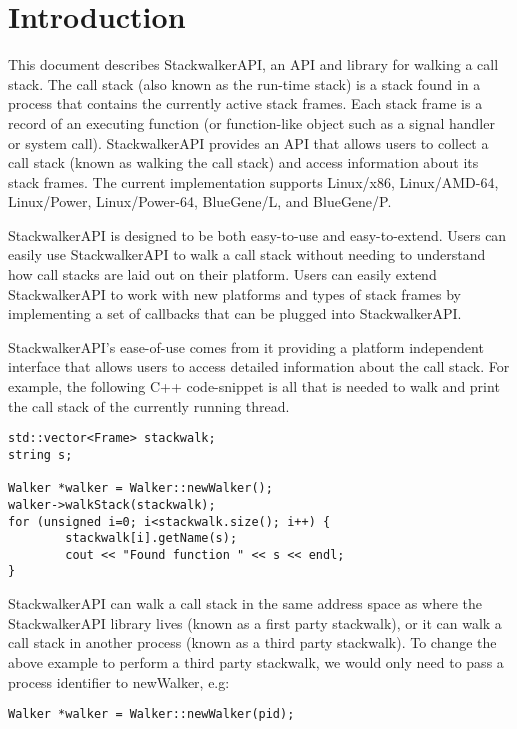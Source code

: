 \section{Introduction}
\label{sec:intro}
This document describes StackwalkerAPI, an API and library for walking a call
stack. The call stack (also known as the run-time stack) is a stack found in a
process that contains the currently active stack frames. Each stack frame is a
record of an executing function (or function-like object such as a signal
handler or system call). StackwalkerAPI provides an API that allows users to
collect a call stack (known as walking the call stack) and access information
about its stack frames. The current implementation supports Linux/x86,
Linux/AMD-64, Linux/Power, Linux/Power-64, BlueGene/L, and BlueGene/P.

StackwalkerAPI is designed to be both easy-to-use and easy-to-extend. Users can
easily use StackwalkerAPI to walk a call stack without needing to understand how
call stacks are laid out on their platform. Users can easily extend
StackwalkerAPI to work with new platforms and types of stack frames by
implementing a set of callbacks that can be plugged into StackwalkerAPI.

StackwalkerAPI's ease-of-use comes from it providing a platform independent
interface that allows users to access detailed information about the call stack.
For example, the following C++ code-snippet is all that is needed to walk and
print the call stack of the currently running thread.

\lstset{numbers=left, numberstyle=\tiny, stepnumber=5, numbersep=5pt}
\begin{lstlisting}
std::vector<Frame> stackwalk; 
string s;

Walker *walker = Walker::newWalker();
walker->walkStack(stackwalk);
for (unsigned i=0; i<stackwalk.size(); i++) {
		stackwalk[i].getName(s);
		cout << "Found function " << s << endl;
}	
\end{lstlisting}

StackwalkerAPI can walk a call stack in the same address space as where the
StackwalkerAPI library lives (known as a first party stackwalk), or it can walk
a call stack in another process (known as a third party stackwalk). To change
the above example to perform a third party stackwalk, we would only need to pass
a process identifier to newWalker, e.g: 
\begin{lstlisting}
Walker *walker = Walker::newWalker(pid);
\end{lstlisting}
	
